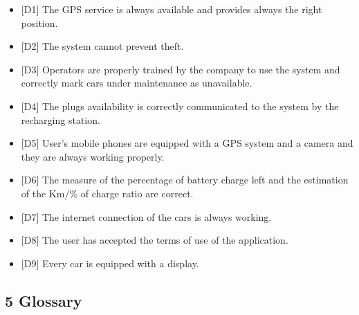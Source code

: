 \documentclass[]{article}
\providecommand{\tightlist}{%
  \setlength{\itemsep}{0pt}\setlength{\parskip}{0pt}}
\begin{document}
\begin{itemize}
\tightlist
\item
  {[}D1{]} The GPS service is always available and provides always the
  right position.
\item
  {[}D2{]} The system cannot prevent theft.
\item
  {[}D3{]} Operators are properly trained by the company to use the
  system and correctly mark cars under maintenance as unavailable.
\item
  {[}D4{]} The plugs availability is correctly communicated to the
  system by the recharging station.
\item
  {[}D5{]} User's mobile phones are equipped with a GPS system and a
  camera and they are always working properly.
\item
  {[}D6{]} The measure of the percentage of battery charge left and the
  estimation of the Km/\% of charge ratio are correct.
\item
  {[}D7{]} The internet connection of the cars is always working.
\item
  {[}D8{]} The user has accepted the terms of use of the application.
\item
  {[}D9{]} Every car is equipped with a display.
\end{itemize}

\subsection{5 Glossary}\label{glossary}
\end{document}
